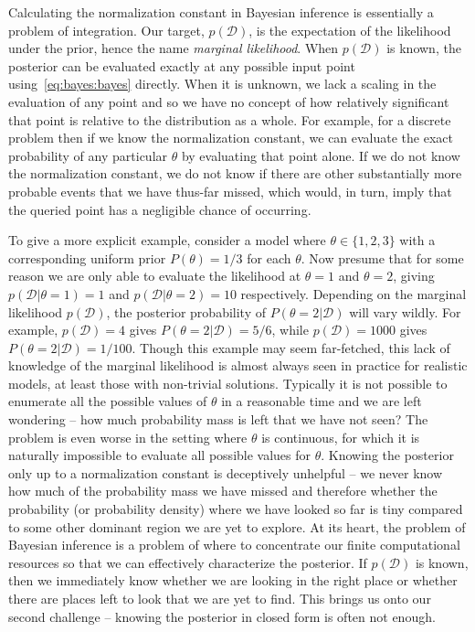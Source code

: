 Calculating the normalization constant in Bayesian inference is essentially a problem of
integration.  Our target, $p(\mathcal{D})$, is the expectation of the likelihood under the prior,
hence the name \emph{marginal likelihood}.  When $p(\mathcal{D})$ is known, the posterior can be evaluated
exactly at any possible input point using~\eqref{eq:bayes:bayes} directly.  When it is unknown, we lack
a scaling in the evaluation of any point and so we have no concept of how relatively 
significant that point is relative to the distribution as a whole.  For example, for a discrete
problem then if we know the normalization constant, we can evaluate the exact probability of any
particular $\theta$ by evaluating that point alone.  If we do not know the normalization constant, we do
not know if there are other substantially more probable events that we have thus-far missed, which
would, in turn, imply that the queried point has a negligible chance of occurring.
 
To give a more explicit example, consider a model where $\theta \in \{1,2,3\}$ with a corresponding uniform prior $P(\theta) = 1/3$
for each $\theta$.  Now presume that for some reason we are only able to evaluate the likelihood at 
$\theta=1$ and $\theta=2$, giving $p(\mathcal{D}|\theta=1)=1$ and $p(\mathcal{D}|\theta=2)=10$ respectively.  Depending on the marginal
likelihood $p(\mathcal{D})$, the posterior probability of $P(\theta=2 | \mathcal{D})$ will vary wildly.  For example,
$p(\mathcal{D})=4$ gives $P(\theta=2 | \mathcal{D}) = 5/6$, while $p(\mathcal{D})=1000$ gives $P(\theta=2 | \mathcal{D}) = 1/100$.  Though this
example may seem far-fetched, this lack of knowledge of the marginal likelihood is almost always seen in practice for realistic
models, at least those with non-trivial solutions.   Typically it is not
possible to enumerate all the possible values of $\theta$ in a reasonable time and we are left 
wondering -- how much probability mass is left that we have not seen?  The problem is even worse 
in the setting where $\theta$ is continuous, for
which it is naturally impossible to evaluate all possible values for $\theta$.  
Knowing the posterior only up to a normalization constant is deceptively unhelpful -- we never
know how much of the probability mass we have missed and therefore whether the probability (or
probability density) where we have looked so far is tiny compared to some other dominant region
we are yet to explore.  At its heart, the problem of Bayesian inference is a problem
of where to concentrate our finite computational resources so that we can effectively characterize
the posterior.  If $p(\mathcal{D})$ is known, then we immediately know whether we are looking in the right
place or whether there are places left to look that we are yet to find.  This brings us onto
our second challenge -- knowing the posterior in closed form is often not enough.

